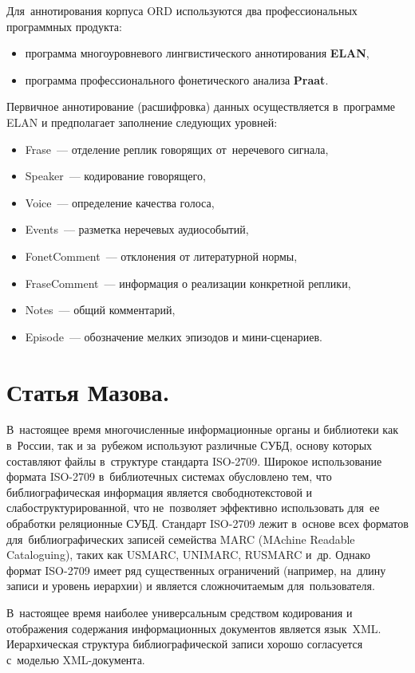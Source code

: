 \documentclass[12pt]{article}
\theoremstyle{definition}
\theoremstyle{remark}
\numberwithin{equation}{section}
\begin{document}
Для~аннотирования корпуса ORD используются два профессиональных
программных продукта:
\begin{itemize}
    \item программа многоуровневого лингвистического
    аннотирования \textbf{ELAN},
    \item программа профессионального фонетического
    анализа \textbf{Praat}.
\end{itemize}

Первичное аннотирование (расшифровка) данных осуществляется
в~программе ELAN и предполагает заполнение следующих уровней:
\begin{itemize}
    \item Frase~--- отделение реплик говорящих от~неречевого сигнала,
    \item Speaker~--- кодирование говорящего,
    \item Voice~--- определение качества голоса,
    \item Events~--- разметка неречевых аудиособытий,
    \item FonetComment~--- отклонения от литературной нормы,
    \item FraseComment~--- информация о реализации конкретной реплики,
    \item Notes~--- общий комментарий,
    \item Episode~--- обозначение мелких эпизодов и
    мини\nobreakdash-сценариев.
\end{itemize}


\section{Статья Мазова.}
В~настоящее время многочисленные информационные органы
и библиотеки как в~России, так и за~рубежом используют
различные СУБД, основу которых составляют файлы в~структуре
стандарта ISO-2709. Широкое использование формата ISO-2709
в~библиотечных системах обусловлено тем, что библиографическая
информация является свободнотекстовой и слабоструктурированной,
что не~позволяет эффективно использовать для~ее обработки
реляционные СУБД. Стандарт ISO-2709 лежит в~основе всех форматов
для~библиографических записей семейства MARC (MAchine Readable
Cataloguing), таких как USMARC, UNIMARC, RUSMARC и~др. Однако
формат ISO-2709 имеет ряд существенных ограничений (например,
на~длину записи и уровень иерархии) и является сложночитаемым
для~пользователя.

В~настоящее время наиболее универсальным средством кодирования
и отображения содержания информационных документов является язык~XML.
Иерархическая структура библиографической записи хорошо согласуется
с~моделью XML-документа.
\end{document}

